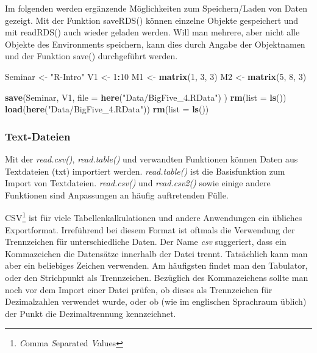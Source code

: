 \documentclass[]{article}
\newenvironment{Shaded}{\begin{snugshade}}{\end{snugshade}}
\newcommand{\KeywordTok}[1]{\textcolor[rgb]{0.13,0.29,0.53}{\textbf{#1}}}
\newcommand{\DataTypeTok}[1]{\textcolor[rgb]{0.13,0.29,0.53}{#1}}
\newcommand{\DecValTok}[1]{\textcolor[rgb]{0.00,0.00,0.81}{#1}}
\newcommand{\StringTok}[1]{\textcolor[rgb]{0.31,0.60,0.02}{#1}}
\newcommand{\OperatorTok}[1]{\textcolor[rgb]{0.81,0.36,0.00}{\textbf{#1}}}
\newcommand{\NormalTok}[1]{#1}
\let\rmarkdownfootnote\footnote%
\def\footnote{\protect\rmarkdownfootnote}
\begin{document}
Im folgenden werden ergänzende Möglichkeiten zum Speichern/Laden von
Daten gezeigt. Mit der Funktion saveRDS() können einzelne Objekte
gespeichert und mit readRDS() auch wieder geladen werden. Will man
mehrere, aber nicht alle Objekte des Environments speichern, kann dies
durch Angabe der Objektnamen und der Funktion save() durchgeführt
werden.

\begin{Shaded}
\begin{Highlighting}[]
\NormalTok{  Seminar <-}\StringTok{ "R-Intro"}
\NormalTok{  V1      <-}\StringTok{ }\DecValTok{1}\OperatorTok{:}\DecValTok{10}
\NormalTok{  M1      <-}\StringTok{ }\KeywordTok{matrix}\NormalTok{(}\DecValTok{1}\NormalTok{, }\DecValTok{3}\NormalTok{, }\DecValTok{3}\NormalTok{)}
\NormalTok{  M2      <-}\StringTok{ }\KeywordTok{matrix}\NormalTok{(}\DecValTok{5}\NormalTok{, }\DecValTok{8}\NormalTok{, }\DecValTok{3}\NormalTok{)}
  
  \KeywordTok{save}\NormalTok{(Seminar, V1, }\DataTypeTok{file =} \KeywordTok{here}\NormalTok{(}\StringTok{"Data/BigFive_4.RData"}\NormalTok{) )}
  \KeywordTok{rm}\NormalTok{(}\DataTypeTok{list =} \KeywordTok{ls}\NormalTok{())}
  \KeywordTok{load}\NormalTok{(}\KeywordTok{here}\NormalTok{(}\StringTok{"Data/BigFive_4.RData"}\NormalTok{))}
  \KeywordTok{rm}\NormalTok{(}\DataTypeTok{list =} \KeywordTok{ls}\NormalTok{())}
\end{Highlighting}
\end{Shaded}

\subsubsection*{Text-Dateien}\label{text-dateien}

Mit der \emph{read.csv()}, \emph{read.table()} und verwandten Funktionen
können Daten aus Textdateien (txt) importiert werden.
\emph{read.table()} ist die Basisfunktion zum Import von Textdateien.
\emph{read.csv()} und \emph{read.csv2()} sowie einige andere Funktionen
sind Anpassungen an häufig auftretenden Fülle.

CSV\footnote{\emph{C}omma \emph{S}eparated \emph{V}alues} ist für viele
Tabellenkalkulationen und andere Anwendungen ein übliches Exportformat.
Irreführend bei diesem Format ist oftmals die Verwendung der
Trennzeichen für unterschiedliche Daten. Der Name \emph{csv} suggeriert,
dass ein Kommazeichen die Datensätze innerhalb der Datei trennt.
Tatsächlich kann man aber ein beliebiges Zeichen verwenden. Am
häufigsten findet man den Tabulator, oder den Strichpunkt als
Trennzeichen. Bezüglich des Kommazeichens sollte man noch vor dem Import
einer Datei prüfen, ob dieses als Trennzeichen für Dezimalzahlen
verwendet wurde, oder ob (wie im englischen Sprachraum üblich) der Punkt
die Dezimaltrennung kennzeichnet.
\end{document}
